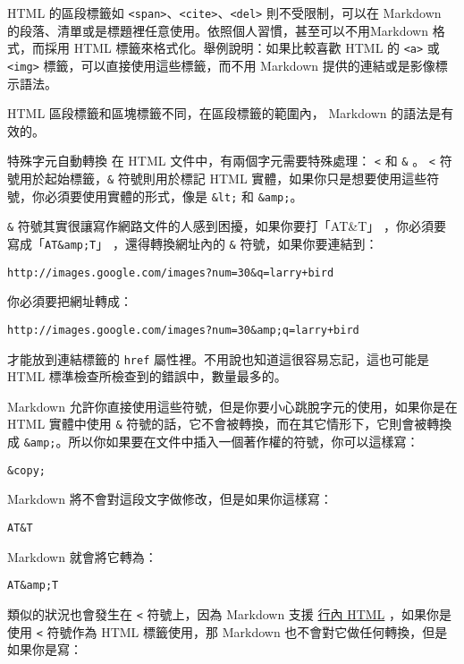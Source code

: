 HTML 的區段標籤如
\texttt{\textless{}span\textgreater{}}、\texttt{\textless{}cite\textgreater{}}、\texttt{\textless{}del\textgreater{}}
則不受限制，可以在 Markdown
的段落、清單或是標題裡任意使用。依照個人習慣，甚至可以不用Markdown
格式，而採用 HTML 標籤來格式化。舉例說明：如果比較喜歡 HTML 的
\texttt{\textless{}a\textgreater{}} 或
\texttt{\textless{}img\textgreater{}} 標籤，可以直接使用這些標籤，而不用
Markdown 提供的連結或是影像標示語法。

HTML 區段標籤和區塊標籤不同，在區段標籤的範圍內， Markdown
的語法是有效的。

特殊字元自動轉換
在 HTML 文件中，有兩個字元需要特殊處理： \texttt{\textless{}} 和
\texttt{\&} 。 \texttt{\textless{}} 符號用於起始標籤，\texttt{\&}
符號則用於標記 HTML
實體，如果你只是想要使用這些符號，你必須要使用實體的形式，像是
\texttt{\&lt;} 和 \texttt{\&amp;}。

\texttt{\&} 符號其實很讓寫作網路文件的人感到困擾，如果你要打「AT\&T」
，你必須要寫成「\texttt{AT\&amp;T}」 ，還得轉換網址內的 \texttt{\&}
符號，如果你要連結到：

\begin{verbatim}
http://images.google.com/images?num=30&q=larry+bird
\end{verbatim}
你必須要把網址轉成：

\begin{verbatim}
http://images.google.com/images?num=30&amp;q=larry+bird
\end{verbatim}
才能放到連結標籤的 \texttt{href}
屬性裡。不用說也知道這很容易忘記，這也可能是 HTML
標準檢查所檢查到的錯誤中，數量最多的。

Markdown
允許你直接使用這些符號，但是你要小心跳脫字元的使用，如果你是在HTML
實體中使用 \texttt{\&}
符號的話，它不會被轉換，而在其它情形下，它則會被轉換成
\texttt{\&amp;}。所以你如果要在文件中插入一個著作權的符號，你可以這樣寫：

\begin{verbatim}
&copy;
\end{verbatim}
Markdown 將不會對這段文字做修改，但是如果你這樣寫：

\begin{verbatim}
AT&T
\end{verbatim}
Markdown 就會將它轉為：

\begin{verbatim}
AT&amp;T
\end{verbatim}
類似的狀況也會發生在 \texttt{\textless{}} 符號上，因為 Markdown 支援
\href{\#html}{行內 HTML} ，如果你是使用 \texttt{\textless{}} 符號作為
HTML 標籤使用，那 Markdown 也不會對它做任何轉換，但是如果你是寫：


